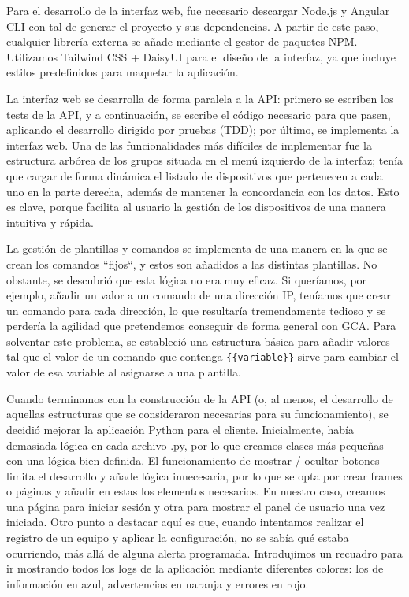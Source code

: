 Para el desarrollo de la interfaz web, fue necesario descargar Node.js y Angular CLI con tal de generar el proyecto
y sus dependencias.
A partir de este paso, cualquier librería externa se añade mediante el gestor de paquetes NPM\@.
Utilizamos Tailwind CSS + DaisyUI para el diseño de la interfaz, ya que incluye estilos predefinidos para
maquetar la aplicación.

La interfaz web se desarrolla de forma paralela a la API: primero se escriben los tests de la API, y a continuación, se escribe
el código necesario para que pasen, aplicando el desarrollo dirigido por pruebas (TDD); por último, se implementa la interfaz web.
Una de las funcionalidades más difíciles de implementar fue la estructura arbórea de los grupos situada en el menú
izquierdo de la interfaz; tenía que cargar de forma dinámica el listado de dispositivos que pertenecen a cada uno en
la parte derecha, además de mantener la concordancia con los datos.
Esto es clave, porque facilita al usuario la gestión de los dispositivos de una manera intuitiva y rápida.

La gestión de plantillas y comandos se implementa de una manera en la que se crean los comandos ``fijos``, y estos
son añadidos a las distintas plantillas.
No obstante, se descubrió que esta lógica no era muy eficaz.
Si queríamos, por ejemplo, añadir un valor a un comando de una dirección IP, teníamos que crear un comando para cada
dirección, lo que resultaría tremendamente tedioso y se perdería la agilidad que pretendemos conseguir de forma general con GCA.
Para solventar este problema, se estableció una estructura básica para añadir valores tal que el valor de un comando que contenga \verb|{{variable}}|
sirve para cambiar el valor de esa variable al asignarse a una plantilla.

Cuando terminamos con la construcción de la API (o, al menos, el desarrollo de aquellas estructuras que se consideraron
necesarias para su funcionamiento), se decidió mejorar la aplicación Python para el cliente.
Inicialmente, había demasiada lógica en cada archivo .py, por lo que creamos clases más pequeñas con una lógica bien definida.
El funcionamiento de mostrar / ocultar botones limita el desarrollo y añade lógica innecesaria, por lo que se opta por
crear frames o páginas y añadir en estas los elementos necesarios.
En nuestro caso, creamos una página para iniciar sesión y otra para mostrar el panel de usuario una vez iniciada.
Otro punto a destacar aquí es que, cuando intentamos realizar el registro de un equipo y aplicar la configuración,
no se sabía qué estaba ocurriendo, más allá de alguna alerta programada.
Introdujimos un recuadro para ir mostrando todos los logs de la aplicación mediante diferentes colores: los de
información en azul, advertencias en naranja y errores en rojo.

